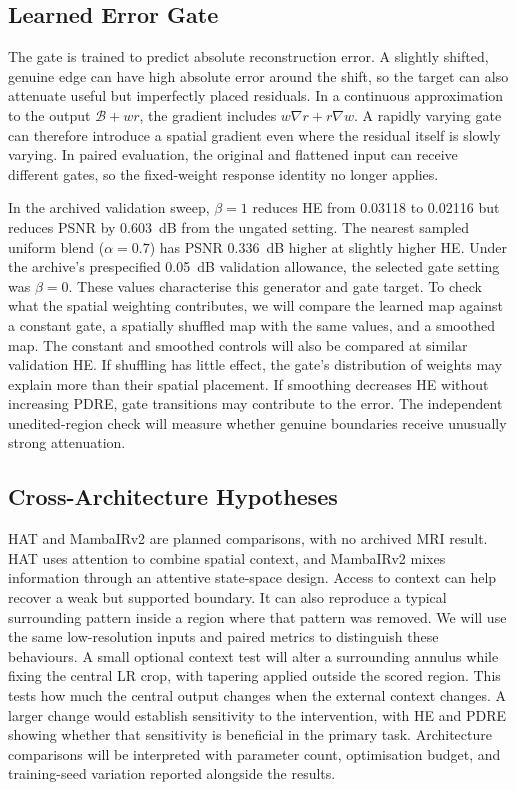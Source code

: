 \documentclass[journal]{IEEEtran}
\begin{document}
\subsection{Learned Error Gate}
The gate is trained to predict absolute reconstruction error. A slightly shifted, genuine edge can have high absolute error around the shift, so the target can also attenuate useful but imperfectly placed residuals. In a continuous approximation to the output $\mathcal{B}+wr$, the gradient includes $w\nabla r+r\nabla w$. A rapidly varying gate can therefore introduce a spatial gradient even where the residual itself is slowly varying. In paired evaluation, the original and flattened input can receive different gates, so the fixed-weight response identity no longer applies.

In the archived validation sweep, $\beta=1$ reduces HE from 0.03118 to 0.02116 but reduces PSNR by 0.603~dB from the ungated setting. The nearest sampled uniform blend ($\alpha=0.7$) has PSNR 0.336~dB higher at slightly higher HE. Under the archive's prespecified 0.05~dB validation allowance, the selected gate setting was $\beta=0$. These values characterise this generator and gate target. To check what the spatial weighting contributes, we will compare the learned map against a constant gate, a spatially shuffled map with the same values, and a smoothed map. The constant and smoothed controls will also be compared at similar validation HE. If shuffling has little effect, the gate's distribution of weights may explain more than their spatial placement. If smoothing decreases HE without increasing PDRE, gate transitions may contribute to the error. The independent unedited-region check will measure whether genuine boundaries receive unusually strong attenuation.

\subsection{Cross-Architecture Hypotheses}
HAT and MambaIRv2 are planned comparisons, with no archived MRI result. HAT uses attention to combine spatial context, and MambaIRv2 mixes information through an attentive state-space design. Access to context can help recover a weak but supported boundary. It can also reproduce a typical surrounding pattern inside a region where that pattern was removed. We will use the same low-resolution inputs and paired metrics to distinguish these behaviours. A small optional context test will alter a surrounding annulus while fixing the central LR crop, with tapering applied outside the scored region. This tests how much the central output changes when the external context changes. A larger change would establish sensitivity to the intervention, with HE and PDRE showing whether that sensitivity is beneficial in the primary task. Architecture comparisons will be interpreted with parameter count, optimisation budget, and training-seed variation reported alongside the results.
\end{document}
